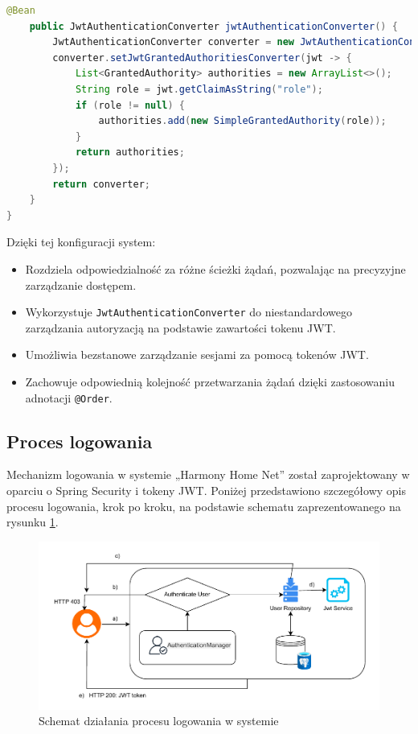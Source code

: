 \begin{lstlisting}[language=Java, style=JavaStyle, caption=Pełna konfiguracja łańcucha filtrów bezpieczeństwa]
    @Bean
    public JwtAuthenticationConverter jwtAuthenticationConverter() {
        JwtAuthenticationConverter converter = new JwtAuthenticationConverter();
        converter.setJwtGrantedAuthoritiesConverter(jwt -> {
            List<GrantedAuthority> authorities = new ArrayList<>();
            String role = jwt.getClaimAsString("role");
            if (role != null) {
                authorities.add(new SimpleGrantedAuthority(role));
            }
            return authorities;
        });
        return converter;
    }
}
\end{lstlisting}

\noindent
Dzięki tej konfiguracji system:
\begin{itemize}
    \item Rozdziela odpowiedzialność za różne ścieżki żądań, pozwalając na precyzyjne zarządzanie dostępem.
    \item Wykorzystuje \texttt{JwtAuthenticationConverter} do niestandardowego zarządzania autoryzacją na podstawie zawartości tokenu JWT.
    \item Umożliwia bezstanowe zarządzanie sesjami za pomocą tokenów JWT.
    \item Zachowuje odpowiednią kolejność przetwarzania żądań dzięki zastosowaniu adnotacji \texttt{@Order}.
\end{itemize}

\subsection{Proces logowania}

Mechanizm logowania w systemie „Harmony Home Net” został zaprojektowany w oparciu o Spring Security i tokeny JWT. Poniżej przedstawiono szczegółowy opis procesu logowania, krok po kroku, na podstawie schematu zaprezentowanego na rysunku \ref{fig:ebok_db_concept}.

\begin{figure}[ht]
    \centering
    \includegraphics[width=.9\linewidth]{rys03/proces_logowania}
    \caption{Schemat działania procesu logowania w systemie~\cite{JWToauth}}
    \label{fig:ebok_db_concept}
\end{figure}

